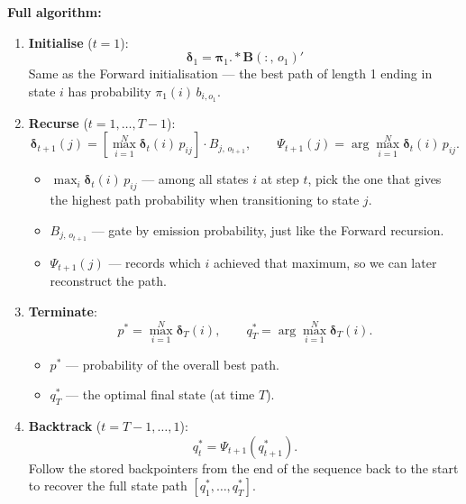 \documentclass[12pt, a4paper]{article}
\begin{document}
\textbf{Full algorithm:}
\begin{enumerate}[leftmargin=1.6em, itemsep=6pt]
  \item \textbf{Initialise} ($t=1$):
    \[
      \boldsymbol{\delta}_1 = \boldsymbol{\pi}_1 \mathbin{.*} \mathbf{B}(:,\,o_1)'
    \]
    Same as the Forward initialisation --- the best path of length 1 ending in
    state $i$ has probability $\pi_1(i)\,b_{i,o_1}$.

  \item \textbf{Recurse} ($t = 1, \ldots, T-1$):
    \[
      \boldsymbol{\delta}_{t+1}(j) =
      \left[\max_{i=1}^{N} \boldsymbol{\delta}_t(i)\,p_{ij}\right]
      \cdot B_{j,\,o_{t+1}},
      \qquad
      \Psi_{t+1}(j) = \arg\max_{i=1}^{N} \boldsymbol{\delta}_t(i)\,p_{ij}.
    \]
    \begin{itemize}[leftmargin=1.2em, itemsep=2pt]
      \item $\max_{i} \boldsymbol{\delta}_t(i)\,p_{ij}$ --- among all states
        $i$ at step $t$, pick the one that gives the highest path probability
        when transitioning to state $j$.
      \item $B_{j,\,o_{t+1}}$ --- gate by emission probability, just like the
        Forward recursion.
      \item $\Psi_{t+1}(j)$ --- records which $i$ achieved that maximum, so
        we can later reconstruct the path.
    \end{itemize}

  \item \textbf{Terminate}:
    \[
      p^* = \max_{i=1}^{N} \boldsymbol{\delta}_T(i), \qquad
      q_T^* = \arg\max_{i=1}^{N} \boldsymbol{\delta}_T(i).
    \]
    \begin{itemize}[leftmargin=1.2em, itemsep=2pt]
      \item $p^*$ --- probability of the overall best path.
      \item $q_T^*$ --- the optimal final state (at time $T$).
    \end{itemize}

  \item \textbf{Backtrack} ($t = T-1, \ldots, 1$):
    \[
      q_t^* = \Psi_{t+1}(q_{t+1}^*).
    \]
    Follow the stored backpointers from the end of the sequence back to the
    start to recover the full state path $[q_1^*, \ldots, q_T^*]$.
\end{enumerate}
\end{document}
